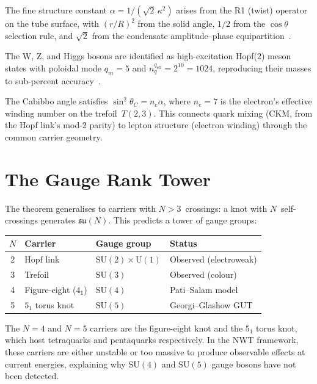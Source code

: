 \documentclass[11pt,a4paper]{article}
\begin{document}
The fine structure constant $\alpha = 1/(\sqrt{2}\,\kappa^2)$
arises from the R1 (twist) operator on the tube surface, with
$(r/R)^2$ from the solid angle, $1/2$ from the $\cos\theta$
selection rule, and $\sqrt{2}$ from the condensate
amplitude--phase equipartition~\cite{paper8a}.

The W, Z, and Higgs bosons are identified as high-excitation
Hopf(2) meson states with poloidal mode $q_m = 5$ and
$n_q^{q_{\text{eff}}} = 2^{10} = 1024$, reproducing their
masses to sub-percent accuracy~\cite{paper8a}.

The Cabibbo angle satisfies
$\sin^2\theta_C = n_e \alpha$, where $n_e = 7$ is the
electron's effective winding number on the trefoil~$T(2,3)$.
This connects quark mixing (CKM, from the Hopf link's mod-2
parity) to lepton structure (electron winding) through the
common carrier geometry.


\section{The Gauge Rank Tower}
\label{sec:tower}

The theorem generalises to carriers with $N > 3$~crossings:
a knot with $N$~self-crossings generates $\mathfrak{su}(N)$.
This predicts a tower of gauge groups:

\begin{center}
\begin{tabular}{clll}
\toprule
$N$ & Carrier & Gauge group & Status \\
\midrule
2 & Hopf link & $\mathrm{SU}(2) \times \mathrm{U}(1)$ &
  Observed (electroweak) \\
3 & Trefoil & $\mathrm{SU}(3)$ & Observed (colour) \\
4 & Figure-eight ($4_1$) & $\mathrm{SU}(4)$ &
  Pati--Salam model~\cite{PatiSalam} \\
5 & $5_1$ torus knot & $\mathrm{SU}(5)$ &
  Georgi--Glashow GUT~\cite{GeorgiGlashow} \\
\bottomrule
\end{tabular}
\end{center}

The $N=4$ and $N=5$ carriers are the figure-eight knot and the
$5_1$ torus knot, which host tetraquarks and pentaquarks
respectively.  In the NWT framework, these carriers are either
unstable or too massive to produce observable effects at current
energies, explaining why $\mathrm{SU}(4)$ and $\mathrm{SU}(5)$
gauge bosons have not been detected.
\end{document}
